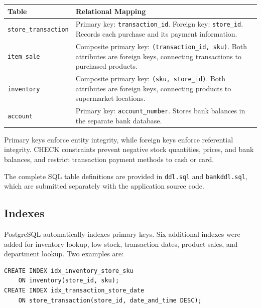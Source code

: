 \documentclass[11pt,letterpaper]{article}
\begin{document}
\begin{center}
\small
\begin{tabularx}{\textwidth}{@{}p{}X@{}}
\hline
Table & Relational Mapping \\ \hline

\texttt{store\_transaction} &
Primary key: \texttt{transaction\_id}.
Foreign key: \texttt{store\_id}.
Records each purchase and its payment information. \\

\texttt{item\_sale} &
Composite primary key: \texttt{(transaction\_id, sku)}.
Both attributes are foreign keys, connecting transactions to purchased products. \\

\texttt{inventory} &
Composite primary key: \texttt{(sku, store\_id)}.
Both attributes are foreign keys, connecting products to supermarket locations. \\

\texttt{account} &
Primary key: \texttt{account\_number}.
Stores bank balances in the separate bank database. \\ \hline

\end{tabularx}
\end{center}

Primary keys enforce entity integrity, while foreign keys enforce referential integrity. CHECK constraints prevent negative stock quantities, prices, and bank balances, and restrict transaction payment methods to cash or card.

The complete SQL table definitions are provided in \texttt{ddl.sql} and \texttt{bankddl.sql}, which are submitted separately with the application source code.



\subsection{Indexes}

PostgreSQL automatically indexes primary keys. Six additional indexes were added for inventory lookup, low stock, transaction dates, product sales, and department lookup. Two examples are:

\begin{lstlisting}
CREATE INDEX idx_inventory_store_sku
    ON inventory(store_id, sku);
CREATE INDEX idx_transaction_store_date
    ON store_transaction(store_id, date_and_time DESC);
\end{lstlisting}
\end{document}
